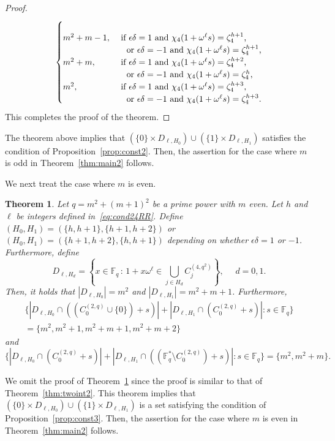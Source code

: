 \documentclass[10pt]{amsart}
\newtheorem{theo}{Theorem}[section]
\theoremstyle{definition}
\newcommand*\F{{\mathbb F}}
\begin{document}
\begin{proof}
\begin{equation*}
\begin{cases}
\\
m^2+m-1,& \text{ if $\epsilon \delta=1$ and $\chi_4(1+\omega^\ell s)=\zeta_4^{h+1}$,}
\\
& \text{\quad or $\epsilon \delta=-1$ and $\chi_4(1+\omega^\ell s)=\zeta_4^{h+1}$,}
\\
m^2+m,& \text{ if $\epsilon \delta=1$ and $\chi_4(1+\omega^\ell s)=\zeta_4^{h+2}$,}
\\
& \text{\quad or $\epsilon \delta=-1$ and $\chi_4(1+\omega^\ell s)=\zeta_4^{h}$,}
\\
m^2,& \text{ if $\epsilon \delta=1$ and $\chi_4(1+\omega^\ell s)=\zeta_4^{h+3}$,}
\\
& \text{\quad or $\epsilon \delta=-1$ and $\chi_4(1+\omega^\ell s)=\zeta_4^{h+3}$.}
\end{cases}
\end{equation*}
This completes the proof of the theorem.
\end{proof}


The theorem above implies that $(\{0\}\times D_{\ell,H_0}) \cup (\{1\}\times D_{\ell,H_1})$ satisfies the condition of Proposition~\ref{prop:const2}. Then, the assertion for the case where $m$ is odd in Theorem~\ref{thm:main2} follows.

We next treat the case where $m$ is even.


\begin{theo}\label{thm:twoint3}
Let $q=m^2+(m+1)^2$ be a prime power with $m$ even. Let $h$ and $\ell$ be integers defined in~\eqref{eq:cond24RR}. Define $(H_0,H_1)=(\{h,h+1\},\{h+1,h+2\})$ or $(H_0,H_1)=(\{h+1,h+2\},\{h,h+1\})$ depending on whether $\epsilon \delta=1$ or $-1$. Furthermore, define
\[
D_{\ell,H_d}=\left\{x\in \F_q\,:\, 1+x\omega^\ell\in \bigcup_{j\in H_d}C_j^{(4,q^2)} \right\}, \quad \, \, d=0,1.
\]
Then, it holds that $|D_{\ell,H_0}|=m^2$ and $|D_{\ell,H_1}|=m^2+m+1$. Furthermore,
\begin{multline*}
\{|D_{\ell,H_0}\cap ((C_0^{(2,q)}\cup \{0\})+s)|+|D_{\ell,H_1}\cap (C_0^{(2,q)}+s)|:s\in \F_q\}\\
=\{m^2,m^2+1,m^2+m+1,m^2+m+2\}
\end{multline*}
and
\[
\{|D_{\ell,H_0}\cap (C_0^{(2,q)}+s)|+|D_{\ell,H_1}\cap ((\F_q^\ast\setminus C_0^{(2,q)})+s)|:s\in \F_q\}= \{m^2,m^2+m\}.
\]
\end{theo}

We omit the proof of Theorem~\ref{thm:twoint3} since the proof is similar to that of Theorem~\ref{thm:twoint2}. This theorem implies that $(\{0\}\times D_{\ell,H_0}) \cup (\{1\}\times D_{\ell,H_1})$ is a set satisfying the condition of Proposition~\ref{prop:const3}. Then, the assertion for the case where $m$ is even in Theorem~\ref{thm:main2} follows.
\end{document}
